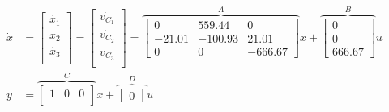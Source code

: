 	\begin{subequations}\label{eq-group1}
		\begin{align}
			\label{eq-lalala}
			\dot{x}
			&=	\begin{bmatrix}
				\dot{x_1} \\
				\dot{x_2} \\
				\dot{x_3} \\
			\end{bmatrix} 
			=	\begin{bmatrix}
				\dot{v_{C_1}} \\
				\dot{v_{C_2}} \\
				\dot{v_{C_3}} \\
			\end{bmatrix}
			=	\overbrace{
				\begin{bmatrix}
					0 & 559.44 & 0 \\
					-21.01 & -100.93 & 21.01 \\
					0 & 0 & -666.67
			\end{bmatrix}}^{A} x
			+	\overbrace{
				\begin{bmatrix}
					0 \\
					0 \\
					666.67
			\end{bmatrix}}^{B} u \\
			\label{eq-ssplanta_final}
			y
			&=	\overbrace{
				\begin{bmatrix}
					1 & 0 & 0 \\
			\end{bmatrix}}^{C} x
			+	\overbrace{
				\begin{bmatrix}
					0
			\end{bmatrix}}^{D} u
		\end{align}
	\end{subequations}